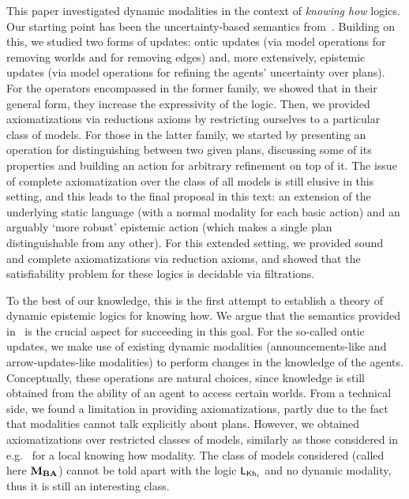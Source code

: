 This paper investigated dynamic modalities in the context of \emph{knowing how} logics. Our starting point has been the uncertainty-based semantics from~\cite{AFSVQ21,AFSVQ23report}. 
Building on this, we studied two forms of updates: ontic updates (via model operations for removing worlds and for removing edges) and, more extensively, epistemic updates (via model operations for refining the agents' uncertainty over plans). For the operators encompassed in the former family, we showed that in their general form, they increase the expressivity of the logic. Then, we provided axiomatizations via reductions axioms by restricting ourselves to a particular class of models. For those in the latter family, we started by presenting an operation for distinguishing between two given plans, discussing some of its properties and building an action for arbitrary refinement on top of it. The issue of complete axiomatization over the class of all models is still elusive in this setting, and this leads to the final proposal in this text: an extension of the underlying static language (with a normal modality for each basic action) and an arguably `more robust' epistemic action (which makes a single plan distinguishable from any other). For this extended setting, we provided sound and complete axiomatizations via reduction axioms, and showed that the satisfiability problem for these logics is decidable via filtrations. 

To the best of our knowledge, this is the first attempt to establish a theory of dynamic epistemic logics for knowing how. We argue that the semantics provided in~\cite{AFSVQ21,AFSVQ23report} is the crucial aspect for succeeding in this goal. For the so-called ontic updates, we make use of existing dynamic modalities (announcements-like and arrow-updates-like modalities) to perform changes in the knowledge of the agents. Conceptually, these operations are natural choices, since knowledge is still obtained from the ability of an agent to access certain worlds. From a technical side, we found a limitation in providing axiomatizations, partly due to the fact that modalities cannot talk explicitly about plans. However, we obtained axiomatizations over restricted classes of models, similarly as those considered in e.g.~\cite{Li21} for a local knowing how modality. 
The class of models considered (called here $\mathbf{M}_{\mathbf{BA}}$) cannot be told apart with the logic $\mathsf{L}_{{\sf Kh}_i}$ and no dynamic modality, thus it is still an interesting class.

